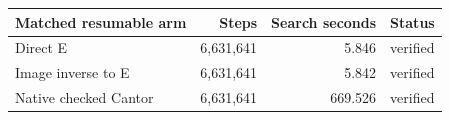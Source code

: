 \begin{tabular}{lrrl}\toprule
Matched resumable arm & Steps & Search seconds & Status\\\midrule
Direct E & 6,631,641 & 5.846 & verified \\
Image inverse to E & 6,631,641 & 5.842 & verified \\
Native checked Cantor & 6,631,641 & 669.526 & verified \\
\bottomrule\end{tabular}
